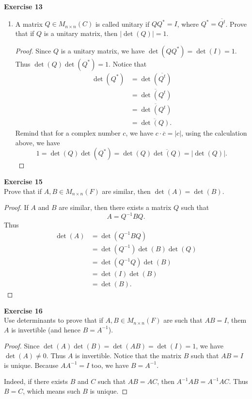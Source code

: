 \documentclass[12pt, a4paper]{article}
\theoremstyle{plain}
\newenvironment{exercise}[2][Exercise]
    { \begin{mdframed}[backgroundcolor=gray!20] \textbf{#1 #2} \\}
    {  \end{mdframed}}
\begin{document}
\begin{exercise}{13}
\begin{enumerate}[label=(\alph*)]
\begin{proof}
\begin{align*}
		&=\sum_{i=1}^{n}{\overline{A_{1i}\det(\tilde{A}_{1i}})}\\
		&=\sum_{i=1}^{n}{\overline{A_{1i}}\cdot \overline{\det(\tilde{A}_{1i}})}\\
		&=\sum_{i=1}^{n}{\overline{A_{1,i}}\cdot\det\left(\overline{\tilde{A}}\right)}\\
		&=\det(\overline{A}).
		\end{align*}
		\end{proof}
	\item A matrix $Q\in M_{n\times n}(C)$ is called unitary if $QQ^*=I$, where $Q^*=\overline{Q^t}$. Prove that if $Q$ is a unitary matrix, then $|\det(Q)|=1$.
		\begin{proof}
		Since $Q$ is a unitary matrix, we have $\det(QQ^*)=\det(I)=1$. Thus $\det(Q)\det(Q^*)=1$. Notice that 
		\begin{align*}
		\det(Q^*)&=\det(\overline{Q^t})\\
		&=\overline{\det(Q^t)}\\
		&=\overline{\det(Q^t)}\\
		&=\overline{\det(Q)}.
		\end{align*}
		Remind that for a complex number $c$, we have $c\cdot \overline{c}=|c|$, using the calculation above, we have 
		\[
		1=\det(Q)\det(Q^*)=\det(Q)\overline{\det(Q)}=|\det(Q)|.
		\]
		\end{proof}
	\end{enumerate}
\end{exercise}

\begin{exercise}{15}
Prove that if $A,B\in M_{n\times n}(F)$ are similar, then $\det(A)=\det(B)$.
\end{exercise}
	\begin{proof}
	If $A$ and $B$ are similar, then there exists a matrix $Q$ such that 
	\[
	A=Q^{-1}BQ.
	\]
	Thus
	\begin{align*}
	\det(A)&=\det(Q^{-1}BQ)\\
	&= \det(Q^{-1})\det(B)\det(Q)\\
	&=\det(Q^{-1}Q)\det(B)\\
	&=\det(I)\det(B)\\
	&=\det(B).
	\end{align*}
	\end{proof}

\begin{exercise}{16}
Use determinants to prove that if $A,B\in M_{n\times n}(F)$ are such that $AB=I$, them $A$ is invertible (and hence $B=A^{-1}$).
\end{exercise}
	\begin{proof}
	Since $\det(A)\det(B)=\det(AB)=\det(I)=1$, we have $\det(A)\neq 0$. Thus $A$ is invertible. Notice that the matrix $B$ such that $AB=I$ is unique. Because $AA^{-1}=I$ too, we have $B=A^{-1}$.
	
	Indeed, if there exists $B$ and $C$ such that $AB=AC$, then $A^{-1}AB=A^{-1}AC$. Thus $B=C$, which means such $B$ is unique. 
	\end{proof}
	
\end{document}
